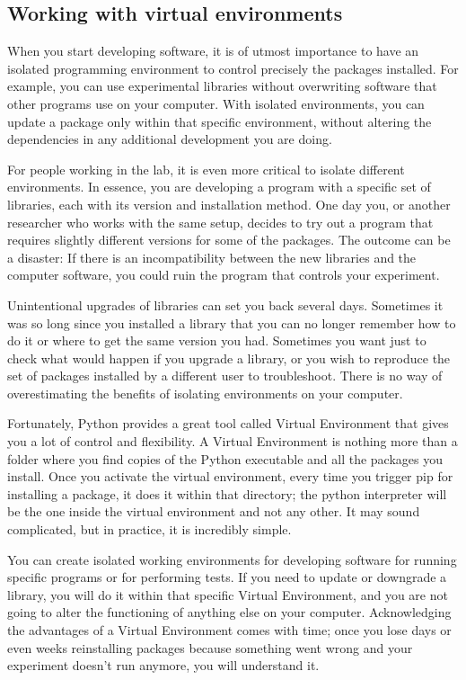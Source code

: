 \subsection{Working with virtual environments}\label{subsec:virtual-environment2}
When you start developing software, it is of utmost importance to have an isolated programming environment to control precisely the packages installed. For example, you can use experimental libraries without overwriting software that other programs use on your computer. With isolated environments, you can update a package only within that specific environment, without altering the dependencies in any additional development you are doing.

For people working in the lab, it is even more critical to isolate different environments. In essence, you are developing a program with a specific set of libraries, each with its version and installation method. One day you, or another researcher who works with the same setup, decides to try out a program that requires slightly different versions for some of the packages. The outcome can be a disaster: If there is an incompatibility between the new libraries and the computer software, you could ruin the program that controls your experiment.

Unintentional upgrades of libraries can set you back several days. Sometimes it was so long since you installed a library that you can no longer remember how to do it or where to get the same version you had. Sometimes you want just to check what would happen if you upgrade a library, or you wish to reproduce the set of packages installed by a different user to troubleshoot. There is no way of overestimating the benefits of isolating environments on your computer.

Fortunately, Python provides a great tool called Virtual Environment that gives you a lot of control and flexibility. A Virtual Environment is nothing more than a folder where you find copies of the Python executable and all the packages you install. Once you activate the virtual environment, every time you trigger pip for installing a package, it does it within that directory; the python interpreter will be the one inside the virtual environment and not any other. It may sound complicated, but in practice, it is incredibly simple.

You can create isolated working environments for developing software for running specific programs or for performing tests. If you need to update or downgrade a library, you will do it within that specific Virtual Environment, and you are not going to alter the functioning of anything else on your computer. Acknowledging the advantages of a Virtual Environment comes with time; once you lose days or even weeks reinstalling packages because something went wrong and your experiment doesn't run anymore, you will understand it.

